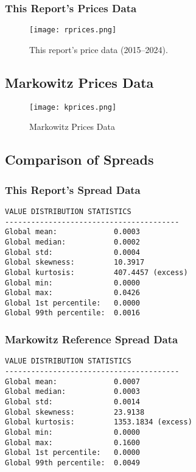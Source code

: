 \documentclass[11pt, letterpaper]{article}
\begin{document}
\subsubsection*{This Report's Prices Data}

\begin{figure}[htbp]
    \centering
    \texttt{[image: rprices.png]}
    \caption{This report's price data (2015–2024).}
    \label{fig:nonnanprices_explore}
\end{figure}

\subsection{Markowitz Prices Data}

\begin{figure}[htbp]
    \centering
    \texttt{[image: kprices.png]}
    \caption{Markowitz Prices Data}
    \label{fig:nonnanprices_explore}
\end{figure}

\subsection{Comparison of Spreads}
\subsubsection*{This Report's Spread Data}
\begin{verbatim}
VALUE DISTRIBUTION STATISTICS
----------------------------------------
Global mean:             0.0003
Global median:           0.0002
Global std:              0.0004
Global skewness:         10.3917
Global kurtosis:         407.4457 (excess)
Global min:              0.0000
Global max:              0.0426
Global 1st percentile:   0.0000
Global 99th percentile:  0.0016
\end{verbatim}

\subsubsection*{Markowitz Reference Spread Data}
\begin{verbatim}
VALUE DISTRIBUTION STATISTICS
----------------------------------------
Global mean:             0.0007
Global median:           0.0003
Global std:              0.0014
Global skewness:         23.9138
Global kurtosis:         1353.1834 (excess)
Global min:              0.0000
Global max:              0.1600
Global 1st percentile:   0.0000
Global 99th percentile:  0.0049
\end{verbatim}
\end{document}
